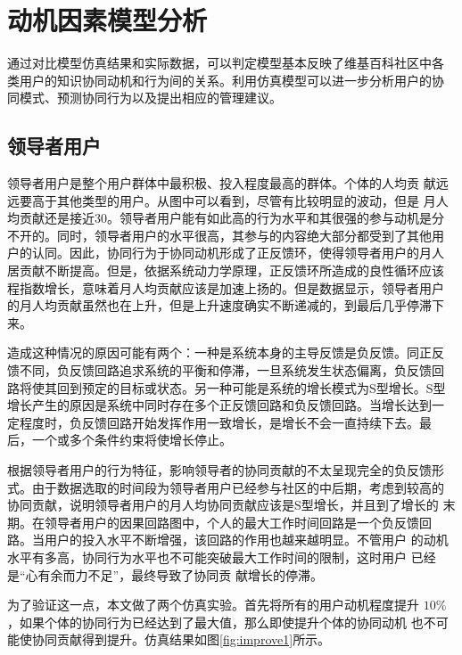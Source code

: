 \section{动机因素模型分析}
通过对比模型仿真结果和实际数据，可以判定模型基本反映了维基百科社区中各
类用户的知识协同动机和行为间的关系。利用仿真模型可以进一步分析用户的协
同模式、预测协同行为以及提出相应的管理建议。

\subsection{领导者用户}

领导者用户是整个用户群体中最积极、投入程度最高的群体。个体的人均贡
献远远要高于其他类型的用户。从图中可以看到，尽管有比较明显的波动，但是
月人均贡献还是接近30。领导者用户能有如此高的行为水平和其很强的参与动机是分
不开的。同时，领导者用户的水平很高，其参与的内容绝大部分都受到了其他用
户的认同。因此，协同行为于协同动机形成了正反馈环，使得领导者用户的月人
居贡献不断提高。但是，依据系统动力学原理，正反馈环所造成的良性循环应该
程指数增长，意味着月人均贡献应该是加速上扬的。但是数据显示，领导者用户
的月人均贡献虽然也在上升，但是上升速度确实不断递减的，到最后几乎停滞下
来。

造成这种情况的原因可能有两个：一种是系统本身的主导反馈是负反馈。同正反
馈不同，负反馈回路追求系统的平衡和停滞，一旦系统发生状态偏离，负反馈回
路将使其回到预定的目标或状态。另一种可能是系统的增长模式为S型增长。S型
增长产生的原因是系统中同时存在多个正反馈回路和负反馈回路。当增长达到一
定程度时，负反馈回路开始发挥作用一致增长，是增长不会一直持续下去。最
后，一个或多个条件约束将使增长停止。

根据领导者用户的行为特征，影响领导者的协同贡献的不太呈现完全的负反馈形
式。由于数据选取的时间段为领导者用户已经参与社区的中后期，考虑到较高的
协同贡献，说明领导者用户的月人均协同贡献应该是S型增长，并且到了增长的
末期。在领导者用户的因果回路图中，个人的最大工作时间回路是一个负反馈回
路。当用户的投入水平不断增强，该回路的作用也越来越明显。不管用户
的动机水平有多高，协同行为水平也不可能突破最大工作时间的限制，这时用户
已经是“心有余而力不足”，最终导致了协同贡
献增长的停滞。

为了验证这一点，本文做了两个仿真实验。首先将所有的用户动机程度提升
$10\%$，如果个体的协同行为已经达到了最大值，那么即使提升个体的协同动机
也不可能使协同贡献得到提升。仿真结果如图\ref{fig:improve1}所示。

